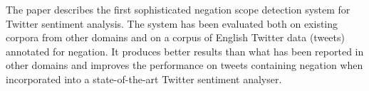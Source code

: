 The paper describes the first sophisticated negation scope detection system for Twitter sentiment analysis. The system has been evaluated both on existing corpora from other domains and on a corpus of English Twitter data (tweets) annotated for negation. It produces better results than what has been reported in other domains and improves the performance on tweets containing negation when incorporated into a state-of-the-art Twitter sentiment analyser.
